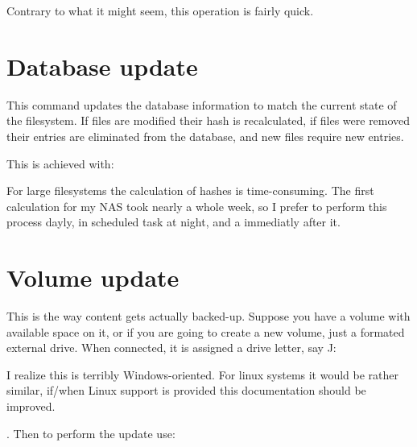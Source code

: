 \documentclass[letterpaper,10pt,english]{sphinxmanual}
\begin{document}
Contrary to what it might seem, this operation is fairly quick.


\section{Database  update}
\label{\detokenize{index:database-files-update}}
This command updates the database information to match the current state of the filesystem.
If files are modified their hash is recalculated, if files were removed their entries are eliminated from
the database, and new files require new entries.

This is achieved with:

\begin{sphinxVerbatim}[commandchars=\\\{\}]
  
\end{sphinxVerbatim}

For large filesystems the calculation of hashes is time-consuming. The first calculation for my NAS took nearly
a whole week, so I prefer to perform this process dayly, in scheduled task at night,
and a  immediatly after it.


\section{Volume update}
\label{\detokenize{index:volume-update}}
This is the way content gets actually backed-up. Suppose you have a volume with available space on it, or if you are going to create
a new volume, just a formated external drive. When connected, it is assigned a drive letter, say J: %
\begin{footnote}[3]\sphinxAtStartFootnote
I realize this is terribly Windows-oriented. For linux systems it would be rather similar, if/when Linux support is provided this documentation should be improved.
%
\end{footnote} . Then
to perform the update use:

\begin{sphinxVerbatim}[commandchars=\\\{\}]
   
\end{sphinxVerbatim}
\end{document}

